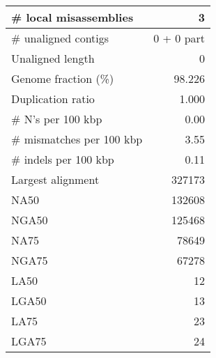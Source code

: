 \documentclass[12pt,a4paper]{article}
\begin{document}
\begin{table}[ht]
\begin{center}
\begin{tabular}{|l*{1}{|r}|}
\# local misassemblies & 3 \\ \hline
\# unaligned contigs & 0 + 0 part \\ \hline
Unaligned length & 0 \\ \hline
Genome fraction (\%) & 98.226 \\ \hline
Duplication ratio & 1.000 \\ \hline
\# N's per 100 kbp & 0.00 \\ \hline
\# mismatches per 100 kbp & 3.55 \\ \hline
\# indels per 100 kbp & 0.11 \\ \hline
Largest alignment & 327173 \\ \hline
NA50 & 132608 \\ \hline
NGA50 & 125468 \\ \hline
NA75 & 78649 \\ \hline
NGA75 & 67278 \\ \hline
LA50 & 12 \\ \hline
LGA50 & 13 \\ \hline
LA75 & 23 \\ \hline
LGA75 & 24 \\ \hline
\end{tabular}
\end{center}
\end{table}
\end{document}
